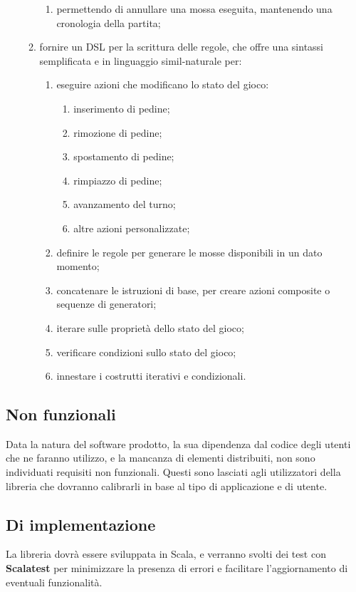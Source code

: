\begin{enumerate}[resume]
\begin{enumerate}[label*=\arabic*.]
\begin{enumerate}[label*=\arabic*.]
            \item \label{req:undo} permettendo di annullare una mossa eseguita, mantenendo una cronologia della partita;
        \end{enumerate}
        \item \label{req:dsl} fornire un DSL per la scrittura delle regole, che offre una sintassi semplificata e in linguaggio simil-naturale per:
        \begin{enumerate}[label*=\arabic*.]
            \item \label{req:action} eseguire azioni che modificano lo stato del gioco:
            \begin{enumerate}[label*=\arabic*.]
                \item inserimento di pedine;
                \item rimozione di pedine;
                \item spostamento di pedine;
                \item rimpiazzo di pedine;
                \item avanzamento del turno;
                \item altre azioni personalizzate;
            \end{enumerate}
            \item \label{req:generator} definire le regole per generare le mosse disponibili in un dato momento;
            \item concatenare le istruzioni di base, per creare azioni composite o sequenze di generatori;
            \item iterare sulle proprietà dello stato del gioco;
            \item verificare condizioni sullo stato del gioco;
            \item \label{req:iterating} innestare i costrutti iterativi e condizionali.
        \end{enumerate}
    \end{enumerate}
\end{enumerate}

\subsection{Non funzionali}

Data la natura del software prodotto, la sua dipendenza dal codice degli utenti che ne faranno utilizzo, e la mancanza di elementi distribuiti, non sono individuati requisiti non funzionali.
%
Questi sono lasciati agli utilizzatori della libreria che dovranno calibrarli in base al tipo di applicazione e di utente.

\subsection{Di implementazione}

La libreria dovrà essere sviluppata in Scala, e verranno svolti dei test con \textbf{Scalatest} per minimizzare la presenza di errori e facilitare l'aggiornamento di eventuali funzionalità.
